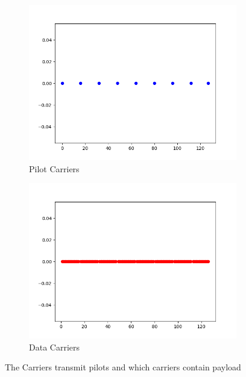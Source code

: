 \begin{figure}[htbp]
    \centering
     \begin{subfigure}[t]{.49\linewidth}
        \includegraphics[width=\linewidth]{../Source/results/pilotCarriers.png}
        \caption{Pilot Carriers}
        \label{pilotCarriers}
    \end{subfigure}
    \begin{subfigure}[t]{0.49\linewidth}
        \includegraphics[width=\linewidth]{../Source/results/dataCarriers.png}
        \caption{Data Carriers}
        \label{dataCarriers}
    \end{subfigure}
    \caption{The Carriers transmit pilots and which carriers contain payload}
\end{figure}

